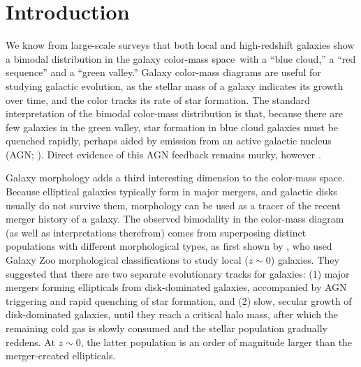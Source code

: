 \section{Introduction} \label{sec:intro}

We know from large-scale surveys that both local and high-redshift galaxies show a bimodal distribution in the galaxy color-mass space\,\citep{strateva_01,baldry_04,baldry_06,brammer_09} with a ``blue cloud,'' a ``red sequence'' and a ``green valley.'' Galaxy color-mass diagrams are useful for studying galactic evolution, as the stellar mass of a galaxy indicates its growth over time, and the color tracks its rate of star formation. The standard interpretation of the bimodal color-mass distribution is that, because there are few galaxies in the green valley, star formation in blue cloud galaxies must be quenched rapidly, perhaps aided by emission from an active galactic nucleus (AGN; \citealp{bell_04,faber_07}). Direct evidence of this AGN feedback remains murky, however \citep{harrison_17}.

Galaxy morphology adds a third interesting dimension to the color-mass space. Because elliptical galaxies typically form in major mergers, and galactic disks usually do not survive them, morphology can be used as a tracer of the recent merger history of a galaxy. The observed bimodality in the color-mass diagram (as well as interpretations therefrom) comes from superposing distinct populations with different morphological types, as first shown by \citet{Schawinski2014TheGalaxies}, who used Galaxy Zoo morphological classifications to study local ($z\sim0$) galaxies. They suggested that there are two separate evolutionary tracks for galaxies: (1) major mergers forming ellipticals from disk-dominated galaxies, accompanied by AGN triggering and rapid quenching of star formation, and (2) slow, secular growth of disk-dominated galaxies, until they reach a critical halo mass, after which the remaining cold gas is slowly consumed and the stellar population gradually reddens. At $z\sim0$, the latter population is an order of magnitude larger than the merger-created ellipticals. 


